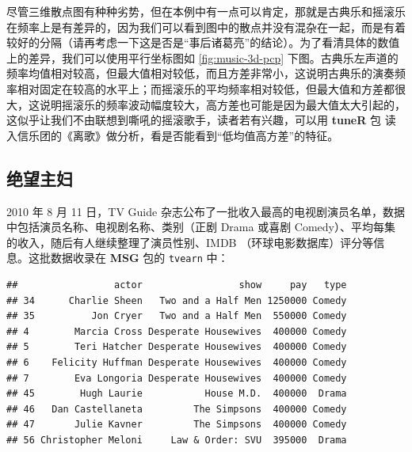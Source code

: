 \documentclass[
  b5paper,
  UTF8,twoside]{book}
\newenvironment{Shaded}{\begin{snugshade}}{\end{snugshade}}
\newcommand{\AttributeTok}[1]{\textcolor[rgb]{0.13,0.29,0.53}{#1}}
\newcommand{\CommentTok}[1]{\textcolor[rgb]{0.56,0.35,0.01}{\textit{#1}}}
\newcommand{\ConstantTok}[1]{\textcolor[rgb]{0.56,0.35,0.01}{#1}}
\newcommand{\DecValTok}[1]{\textcolor[rgb]{0.00,0.00,0.81}{#1}}
\newcommand{\FunctionTok}[1]{\textcolor[rgb]{0.13,0.29,0.53}{\textbf{#1}}}
\newcommand{\NormalTok}[1]{#1}
\newcommand{\SpecialCharTok}[1]{\textcolor[rgb]{0.81,0.36,0.00}{\textbf{#1}}}
\newcommand{\StringTok}[1]{\textcolor[rgb]{0.31,0.60,0.02}{#1}}
\begin{document}
尽管三维散点图有种种劣势，但在本例中有一点可以肯定，那就是古典乐和摇滚乐在频率上是有差异的，因为我们可以看到图中的散点并没有混杂在一起，而是有着较好的分隔（请再考虑一下这是否是``事后诸葛亮''的结论）。为了看清具体的数值上的差异，我们可以使用平行坐标图如 \ref{fig:music-3d-pcp} 下图。古典乐左声道的频率均值相对较高，但最大值相对较低，而且方差非常小，这说明古典乐的演奏频率相对固定在较高的水平上；而摇滚乐的平均频率相对较低，但最大值和方差都很大，这说明摇滚乐的频率波动幅度较大，高方差也可能是因为最大值太大引起的，这似乎让我们不由联想到嘶吼的摇滚歌手，读者若有兴趣，可以用 \textbf{tuneR} 包 \citep{tuneR} 读入信乐团的《离歌》做分析，看是否能看到``低均值高方差''的特征。

\subsection{绝望主妇}\label{subsec:tvearn}

2010 年 8 月 11 日，TV Guide 杂志公布了一批收入最高的电视剧演员名单，数据中包括演员名称、电视剧名称、类别（正剧 Drama 或喜剧 Comedy）、平均每集的收入，随后有人继续整理了演员性别、IMDB （环球电影数据库）评分等信息。这批数据收录在 \textbf{MSG} 包的 \texttt{tvearn} 中：

\begin{Shaded}
\end{Shaded}

\begin{verbatim}
##                 actor                 show     pay   type
## 34      Charlie Sheen   Two and a Half Men 1250000 Comedy
## 35          Jon Cryer   Two and a Half Men  550000 Comedy
## 4        Marcia Cross Desperate Housewives  400000 Comedy
## 5        Teri Hatcher Desperate Housewives  400000 Comedy
## 6    Felicity Huffman Desperate Housewives  400000 Comedy
## 7        Eva Longoria Desperate Housewives  400000 Comedy
## 45        Hugh Laurie           House M.D.  400000  Drama
## 46   Dan Castellaneta         The Simpsons  400000 Comedy
## 47       Julie Kavner         The Simpsons  400000 Comedy
## 56 Christopher Meloni     Law & Order: SVU  395000  Drama
\end{verbatim}
\end{document}
